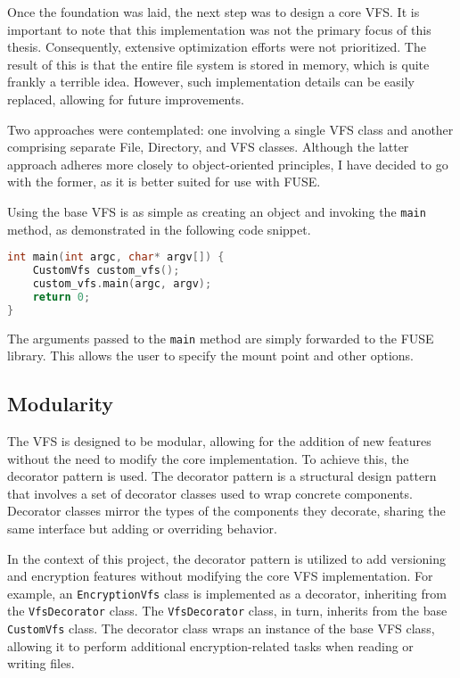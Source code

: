 Once the foundation was laid, the next step was to design a core VFS\@.
It is important to note that this implementation was not the primary focus of this thesis.
Consequently, extensive optimization efforts were not prioritized.
The result of this is that the entire file system is stored in memory, which is quite frankly a terrible idea.
However, such implementation details can be easily replaced, allowing for future improvements.


Two approaches were contemplated: one involving a single VFS class and another comprising separate File, Directory, and VFS classes.
Although the latter approach adheres more closely to object-oriented principles, I have decided to go with the former, as it is better suited for use with FUSE.

Using the base VFS is as simple as creating an object and invoking the \texttt{main} method, as demonstrated in the following code snippet.

\begin{lstlisting}[language=c++, basicstyle=\ttfamily\small]
int main(int argc, char* argv[]) {
    CustomVfs custom_vfs();
    custom_vfs.main(argc, argv);
    return 0;
}
\end{lstlisting}

The arguments passed to the \texttt{main} method are simply forwarded to the FUSE library.
This allows the user to specify the mount point and other options.

\subsection{Modularity}\label{subsec:modularity}

The VFS is designed to be modular, allowing for the addition of new features without the need to modify the core implementation.
To achieve this, the decorator pattern is used.
The decorator pattern is a structural design pattern that involves a set of decorator classes used to wrap concrete components.
Decorator classes mirror the types of the components they decorate, sharing the same interface but adding or overriding behavior.

In the context of this project, the decorator pattern is utilized to add versioning and encryption features without modifying the core VFS implementation.
For example, an \texttt{EncryptionVfs} class is implemented as a decorator, inheriting from the \texttt{VfsDecorator} class.
The \texttt{VfsDecorator} class, in turn, inherits from the base \texttt{CustomVfs} class.
The decorator class wraps an instance of the base VFS class, allowing it to perform additional encryption-related tasks when reading or writing files.

